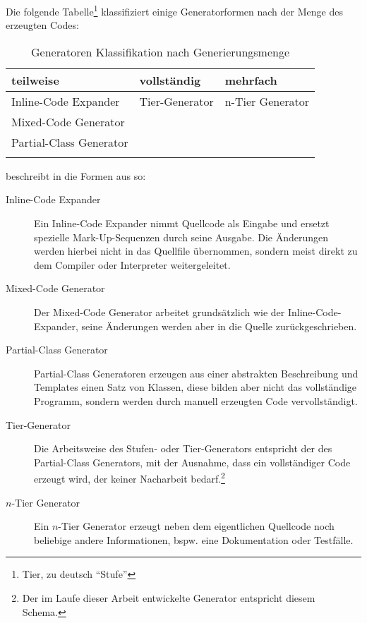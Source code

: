 Die folgende Tabelle\footnote{Tier, zu deutsch \enquote{Stufe}} klassifiziert einige Generatorformen nach der Menge des erzeugten Codes:
\begin{table}[htb]
    \begin{longtable}[c]{l l l}
        \toprule
        \rowcolor{lightgray}
        \textbf{teilweise}   & \textbf{vollständig}     & \textbf{mehrfach}\\
        \midrule
        Inline-Code Expander    & Tier-Generator    & n-Tier Generator\\
        Mixed-Code Generator & &\\
        Partial-Class Generator & & \\
        \bottomrule
        \caption{Generatoren Klassifikation nach Generierungsmenge}
        \label{tab:generatorclassification}
    \end{longtable} 
\end{table}

\citeauthor{herrington2003code} beschreibt in \cite[Kapitel 4][]{herrington2003code} die Formen aus  so:
\begin{description}
    \item[Inline-Code Expander]
        Ein Inline-Code Expander nimmt Quellcode als Eingabe und ersetzt spezielle Mark-Up-Sequenzen durch seine Ausgabe. Die Änderungen werden hierbei nicht in das Quellfile übernommen, sondern meist direkt zu dem Compiler oder Interpreter weitergeleitet.
    \item[Mixed-Code Generator]
        Der Mixed-Code Generator arbeitet grundsätzlich wie der Inline-Code-Expander, seine Änderungen werden aber in die Quelle zurückgeschrieben.
    \item[Partial-Class Generator]
        Partial-Class Generatoren erzeugen aus einer abstrakten Beschreibung und Templates einen Satz von Klassen, diese bilden aber nicht das vollständige Programm, sondern werden durch manuell erzeugten Code vervollständigt. %
    \item[Tier-Generator]
        Die Arbeitsweise des Stufen- oder Tier-Generators entspricht der des Partial-Class Generators, mit der Ausnahme, dass ein vollständiger Code erzeugt wird, der keiner Nacharbeit bedarf.\footnote{Der im Laufe dieser Arbeit entwickelte Generator entspricht diesem Schema.}
    \item[$n$-Tier Generator] 
        Ein $n$-Tier Generator erzeugt neben dem eigentlichen Quellcode noch beliebige andere Informationen, bspw. eine Dokumentation oder Testfälle.
\end{description}

